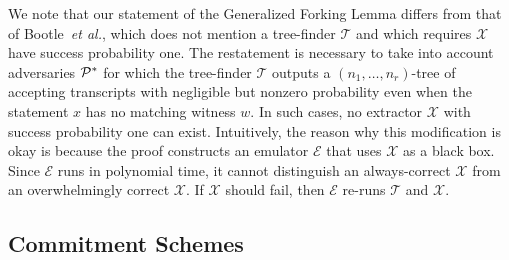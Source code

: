 We note that our statement of the Generalized Forking Lemma differs from that of Bootle~\emph{et al.}, which does not mention a tree-finder $\mathcal{T}$ and which requires $\mathcal{X}$ have success probability one. The restatement is necessary to take into account adversaries $\mathcal{P}^*$ for which the tree-finder $\mathcal{T}$ outputs a $({n_1}, \ldots, {n_r})$-tree of accepting transcripts with negligible but nonzero probability even when the statement $x$ has no matching witness $w$. In such cases, no extractor $\mathcal{X}$ with success probability one can exist. Intuitively, the reason why this modification is okay is because the proof constructs an emulator $\mathcal{E}$ that uses $\mathcal{X}$ as a black box. Since $\mathcal{E}$ runs in polynomial time, it cannot distinguish an always-correct $\mathcal{X}$ from an overwhelmingly correct $\mathcal{X}$. If $\mathcal{X}$ should fail, then $\mathcal{E}$ re-runs $\mathcal{T}$ and $\mathcal{X}$.



\subsection{Commitment Schemes}

